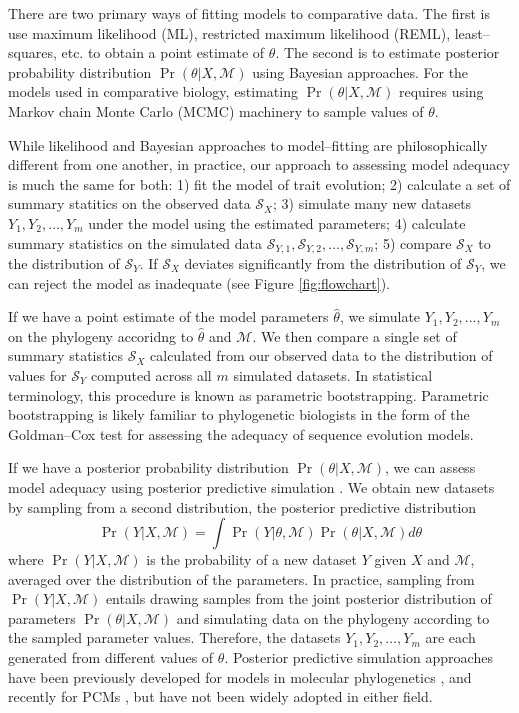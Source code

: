 \documentclass[a4paper,12pt]{article}
\begin{document}
There are two primary ways of fitting models to comparative data. The first is use maximum likelihood (ML), restricted maximum likelihood (REML), least--squares, etc. to obtain a point estimate of $\theta$. The second is to estimate posterior probability distribution $\Pr(\theta|X, \mathcal{M})$ using Bayesian approaches.
For the models used in comparative biology, estimating $\Pr(\theta|X, \mathcal{M})$ requires using Markov chain Monte Carlo (MCMC) machinery to sample values of $\theta$.   

While likelihood and Bayesian approaches to model--fitting are philosophically different from one another, in practice, our approach to assessing model adequacy is much the same for both: 1) fit the model of trait evolution; 2) calculate a set of summary statitics on the observed data $\mathcal{S}_X$; 3) simulate many new datasets $Y_1, Y_2, \ldots, Y_m$ under the model using the estimated parameters; 4) calculate summary statistics on the simulated data $\mathcal{S}_{Y,1}, \mathcal{S}_{Y,2}, \ldots, \mathcal{S}_{Y,m}$; 5) compare $\mathcal{S}_X$ to the distribution of $\mathcal{S}_Y$. If $\mathcal{S}_X$ deviates significantly from the distribution of $\mathcal{S}_Y$, we can reject the model as inadequate (see Figure \ref{fig:flowchart}).

If we have a point estimate of the model parameters $\hat{\theta}$, we simulate $Y_1, Y_2, \ldots, Y_m$ on the phylogeny accoridng to $\hat{\theta}$ and $\mathcal{M}$. We then compare a single set of summary statistics $\mathcal{S}_X$ calculated from our observed data to the distribution of values for $\mathcal{S}_Y$ computed across all $m$ simulated datasets. In statistical terminology, this procedure is known as parametric bootstrapping. Parametric bootstrapping is likely familiar to phylogenetic biologists in the form of the Goldman--Cox test \citep{Goldman} for assessing the adequacy of sequence evolution models.

If we have a posterior probability distribution $\Pr(\theta|X, \mathcal{M})$, we can assess model adequacy using posterior predictive simulation \citep{Rubin1984, Gelman1996}. We obtain new datasets by sampling from a second distribution, the posterior predictive distribution
\begin{equation}
\Pr(Y|X,\mathcal{M}) = \int \Pr(Y|\theta, \mathcal{M})\Pr(\theta |X,\mathcal{M})d\theta
\end{equation}
where $\Pr(Y|X,\mathcal{M})$ is the probability of a new dataset $Y$ given $X$ and $\mathcal{M}$, averaged over the distribution of the parameters. In practice, sampling from $\Pr(Y|X,\mathcal{M})$ entails drawing samples from the joint posterior distribution of parameters $\Pr(\theta|X, \mathcal{M})$ and simulating data on the phylogeny according to the sampled parameter values. Therefore, the datasets $Y_1, Y_2, \ldots, Y_m$ are each generated from different values of $\theta$.  
Posterior predictive simulation approaches have been previously developed for models in molecular phylogenetics \citep{Bollback2002, Reid2013, Lewis2013, Brown2013}, and recently for PCMs \citep{SlaterPennell}, but have not been widely adopted in either field.
\end{document}
